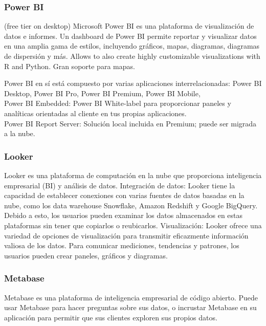 \documentclass[12pt]{book}
\begin{document}

\subsubsection{Power BI} (free tier on desktop)
Microsoft Power BI es una plataforma de visualización de datos e informes. Un dashboard de Power BI permite reportar y visualizar 
datos en una amplia gama de estilos, incluyendo gráficos, mapas, diagramas, diagramas de dispersión y más.
Allows to also create highly customizable visualizations with R and Python. 
Gran soporte para mapas.

Power BI en sí está compuesto por varias aplicaciones interrelacionadas: Power BI Desktop, Power BI Pro, Power BI Premium, Power BI Mobile,\\
Power BI Embedded: Power BI White-label para proporcionar paneles y analíticas orientadas al cliente en tus propias aplicaciones.\\
Power BI Report Server: Solución local incluida en Premium; puede ser migrada a la nube.\\

\subsubsection{Looker}
Looker es una plataforma de computación en la nube que proporciona inteligencia empresarial (BI) y análisis de datos.
Integración de datos: Looker tiene la capacidad de establecer conexiones con varias fuentes de datos basadas en la nube, como los data warehouse Snowflake, Amazon Redshift y Google BigQuery. Debido a esto, los usuarios pueden examinar los datos almacenados en estas plataformas sin tener que copiarlos o reubicarlos.
Visualización: Looker ofrece una variedad de opciones de visualización para transmitir eficazmente información valiosa de los datos. Para comunicar mediciones, tendencias y patrones, los usuarios pueden crear paneles, gráficos y diagramas.

\subsubsection{Metabase}
Metabase es una plataforma de inteligencia empresarial de código abierto. Puede usar Metabase para hacer preguntas sobre sus datos, o incrustar Metabase en su aplicación para permitir que sus clientes exploren sus propios datos.
\end{document}
